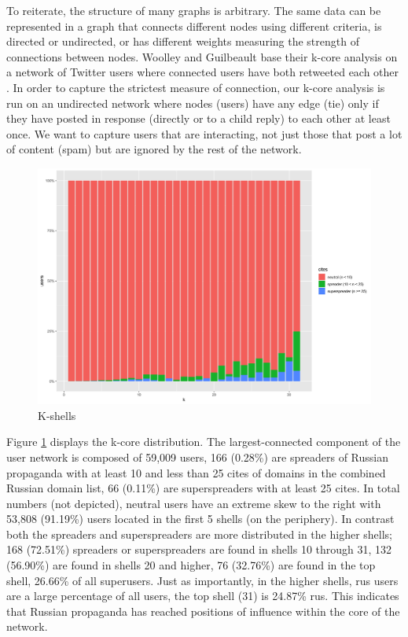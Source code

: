 To reiterate, the structure of many graphs is arbitrary.
The same data can be represented in a graph that connects different nodes using different criteria, is directed or undirected, or has different weights measuring the strength of connections between nodes.
Woolley and Guilbeault base their k-core analysis on a network of Twitter users where connected users have both retweeted each other \cite[p. 202]{woolley2018}.
In order to capture the strictest measure of connection, our k-core analysis is run on an undirected network where nodes (users) have any edge (tie) only if they have posted in response (directly or to a child reply) to each other at least once.
We want to capture users that are interacting, not just those that post a lot of content (spam) but are ignored by the rest of the network.

\begin{figure}[!ht]
\centering
\includegraphics[width=\textwidth]{rus/kshells}
\caption{K-shells}
\label{fig:kshells}
\end{figure}

Figure \ref{fig:kshells} displays the k-core distribution.
The largest-connected component of the user network is composed of 59,009 users, 166 (0.28\%) are spreaders of Russian propaganda with at least 10 and less than 25 cites of domains in the combined Russian domain list, 66 (0.11\%) are superspreaders with at least 25 cites.
In total numbers (not depicted), neutral users have an extreme skew to the right with 53,808 (91.19\%) users located in the first 5 shells (on the periphery).
In contrast both the spreaders and superspreaders are more distributed in the higher shells; 168 (72.51\%) spreaders or superspreaders are found in shells 10 through 31, 132 (56.90\%) are found in shells 20 and higher, 76 (32.76\%) are found in the top shell, 26.66\% of all superusers.
Just as importantly, in the higher shells, rus users are a large percentage of all users, the top shell (31) is 24.87\% rus.
This indicates that Russian propaganda has reached positions of influence within the core of the network.

